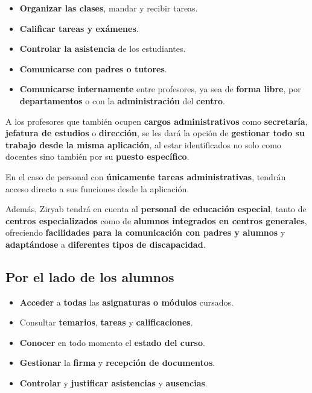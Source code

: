 \documentclass[
  spanish,
  11pt,
]{report}
\providecommand{\tightlist}{%
  \setlength{\itemsep}{0pt}\setlength{\parskip}{0pt}}
\begin{document}
\begin{itemize}
\tightlist
\item
  \textbf{Organizar las clases}, mandar y recibir tareas.
\item
  \textbf{Calificar tareas y exámenes}.
\item
  \textbf{Controlar la asistencia} de los estudiantes.
\item
  \textbf{Comunicarse con padres o tutores}.
\item
  \textbf{Comunicarse internamente} entre profesores, ya sea de
  \textbf{forma libre}, por \textbf{departamentos} o con la
  \textbf{administración} del \textbf{centro}.
\end{itemize}

A los profesores que también ocupen \textbf{cargos administrativos} como
\textbf{secretaría}, \textbf{jefatura de estudios} o \textbf{dirección},
se les dará la opción de \textbf{gestionar todo su trabajo desde la
misma aplicación}, al estar identificados no solo como docentes sino
también por su \textbf{puesto específico}.

En el caso de personal con \textbf{únicamente tareas administrativas},
tendrán acceso directo a sus funciones desde la aplicación.

Además, Ziryab tendrá en cuenta al \textbf{personal de educación
especial}, tanto de \textbf{centros especializados} como de
\textbf{alumnos integrados en centros generales}, ofreciendo
\textbf{facilidades para la comunicación con padres y alumnos} y
\textbf{adaptándose} a \textbf{diferentes tipos de discapacidad}.

\subsection{Por el lado de los
alumnos}\label{por-el-lado-de-los-alumnos}

\begin{itemize}
\tightlist
\item
  \textbf{Acceder} a \textbf{todas} las \textbf{asignaturas o módulos}
  cursados.
\item
  Consultar \textbf{temarios}, \textbf{tareas} y
  \textbf{calificaciones}.
\item
  \textbf{Conocer} en todo momento el \textbf{estado del curso}.
\item
  \textbf{Gestionar} la \textbf{firma} y \textbf{recepción de
  documentos}.
\item
  \textbf{Controlar} y \textbf{justificar asistencias} y
  \textbf{ausencias}.
\end{itemize}
\end{document}
